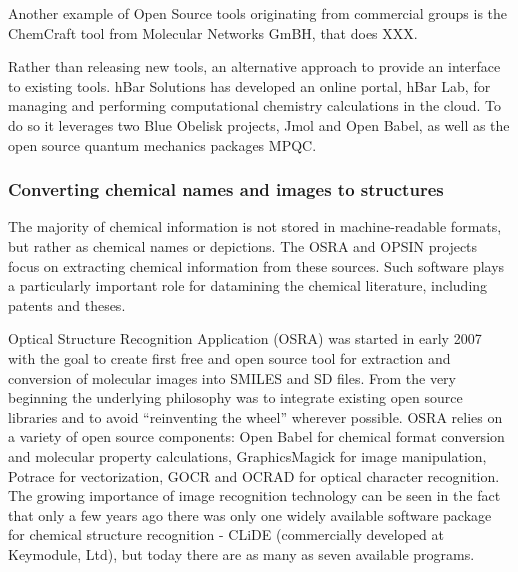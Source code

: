 \documentclass[10pt]{bmc_article}
\newenvironment{bmcformat}{\begin{raggedright}\baselineskip20pt\sloppy\setboolean{publ}{false}}{\end{raggedright}\baselineskip20pt\sloppy}
\begin{document}
\begin{bmcformat}
Another example of Open Source
tools originating from commercial groups is the ChemCraft tool from
Molecular Networks GmBH, that does XXX.

Rather than releasing new tools, an alternative approach to provide an
interface to existing tools. hBar Solutions has developed an online
portal, hBar Lab, for managing and performing computational chemistry
calculations in the cloud. To do so it leverages two Blue Obelisk
projects, Jmol and Open Babel, as well as the open source quantum
mechanics packages MPQC.

\subsubsection*{Converting chemical names and images to structures}

The majority of chemical information is not stored in machine-readable
formats, but rather as chemical names or depictions. The OSRA and OPSIN
projects focus on extracting chemical information from these sources.
Such software plays a particularly important role for datamining the
chemical literature, including patents and theses.

Optical Structure Recognition Application (OSRA) \cite{WebOSRA} was started
in early 2007 with the goal to create first free and open source
tool for extraction and conversion of molecular images into SMILES and
SD files. From the very beginning the underlying philosophy was to integrate
existing open source libraries and to avoid ``reinventing the wheel''
wherever possible. OSRA relies on a variety of open source components:
Open Babel for chemical format
conversion and molecular property calculations, GraphicsMagick for image
manipulation, Potrace for vectorization, GOCR and OCRAD for optical
character recognition. The growing importance of image
recognition technology can be seen in the fact that
only a few years ago there was only one widely available software
package for chemical structure recognition -  CLiDE (commercially
developed at Keymodule, Ltd), but today there are as many as seven
available programs.


\end{bmcformat}
\end{document}
